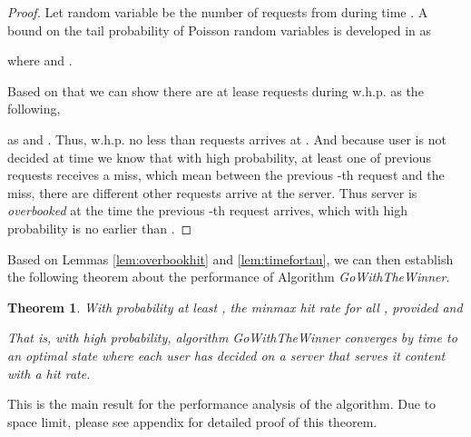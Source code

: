 \documentclass[conference]{IEEEtran}
\newtheorem{theorem}{Theorem}
\begin{document}
\begin{proof}
Let random variable  be the number of requests from  during time .
A bound on the tail probability of Poisson random variables is developed in \cite{PoissonTailBound} as

where  and .

Based on that we can show there are at lease  requests during  w.h.p. as the following,

as  and . Thus, w.h.p. no less than  requests arrives at . And because user is not decided at time  we know that with high probability, at least one of previous  requests receives a miss, which mean between the previous -th request and the miss, there are  different other requests arrive at the server. Thus server  is \textsl{overbooked} at the time the previous -th request arrives, which with high probability is no earlier than .
\end{proof}

Based on Lemmas \ref{lem:overbookhit} and \ref{lem:timefortau}, we can then establish the following theorem about the performance of Algorithm \textsl{GoWithTheWinner}.

\begin{theorem}
\label{thm:hitrate}
With probability at least ,  the minmax hit rate  for all , provided  and 

 That is,  with high probability, 
 algorithm \textsl{GoWithTheWinner} converges by time  to an optimal state where each user  has decided on a server  that serves it content with a  hit rate. 
\end{theorem}

This is the main result for the performance analysis of the algorithm. Due to space limit, please see appendix for detailed proof of this theorem. 
\end{document}

